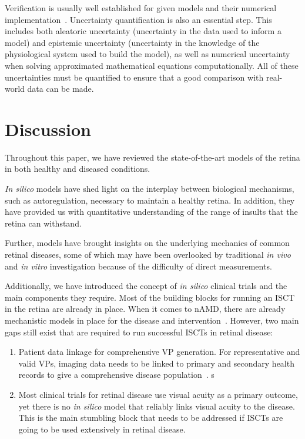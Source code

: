 \documentclass{article}
\begin{document}
Verification is usually well established for given models and their numerical implementation~\cite{Curreli2021, Pappalardo2019}. Uncertainty quantification is also an essential step. This includes both aleatoric uncertainty (uncertainty in the data used to inform a model) and epistemic uncertainty (uncertainty in the knowledge of the physiological system used to build the model), as well as numerical uncertainty when solving approximated mathematical equations computationally. All of these uncertainties must be quantified to ensure that a good comparison with real-world data can be made.


\section{Discussion}\label{sec:Conclusion}

Throughout this paper, we have reviewed the state-of-the-art models of the retina in both healthy and diseased conditions.

\textit{In silico} models have shed light on the interplay between biological mechanisms, such as autoregulation, necessary to maintain a healthy retina.
In addition, they have provided us with quantitative understanding of the range of insults that the retina can withstand.

Further, models have brought insights on the underlying mechanics of common retinal diseases, some of which may have been overlooked by traditional \textit{in vivo} and \textit{in vitro} investigation because of the difficulty of direct measurements.

Additionally, we have introduced the concept of \textit{in silico} clinical trials and the main components they require. 
Most of the building blocks for running an ISCT in the retina are already in place. When it comes to nAMD, there are already mechanistic models in place for the disease and intervention~\cite{Hoyle_2017, Vega2021}. However, two main gaps still exist that are required to run successful ISCTs in retinal disease: 

\begin{enumerate}
\item{Patient data linkage for comprehensive VP generation. For representative and valid VPs, imaging data needs to be linked to primary and secondary health records to give a comprehensive disease population~\cite{ElBouri2021}.}
s
\item{Most clinical trials for retinal disease use visual acuity as a primary outcome, yet there is no \textit{in silico} model that reliably links visual acuity to the disease. This is the main stumbling block that needs to be addressed if ISCTs are going to be used extensively in retinal disease.}
\end{enumerate}
\end{document}
